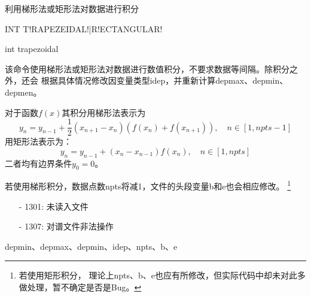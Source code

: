 \label{cmd:int}

利用梯形法或矩形法对数据进行积分

\begin{SACSTX}
INT T!RAPEZEIDAL!|R!ECTANGULAR!
\end{SACSTX}

\begin{SACDFT}
int trapezoidal
\end{SACDFT}

该命令使用梯形法或矩形法对数据进行数值积分，不要求数据等间隔。除积分之外，还会
根据具体情况修改因变量类型idep，并重新计算depmax、depmin、depmen。

对于函数$f(x)$其积分用梯形法表示为
\[
    y_n = y_{n-1} + \frac{1}{2}(x_{n+1}-x_n) (f(x_n)+f(x_{n+1})), \quad n\in[1,npts-1]
\]
用矩形法表示为：
\[
    y_n = y_{n-1} + (x_n-x_{n-1})f(x_n), \quad n\in[1,npts]
\]
二者均有边界条件$y_0=0$。

若使用梯形积分，数据点数npts将减1，文件的头段变量b和e也会相应修改。
\footnote{若使用矩形积分，
理论上npts、b、e也应有所修改，但实际代码中却未对此多做处理，暂不确定是否是Bug。}

\begin{itemize}
\item[-]1301: 未读入文件
\item[-]1307: 对谱文件非法操作
\end{itemize}

depmin、depmax、depmin、idep、npts、b、e
